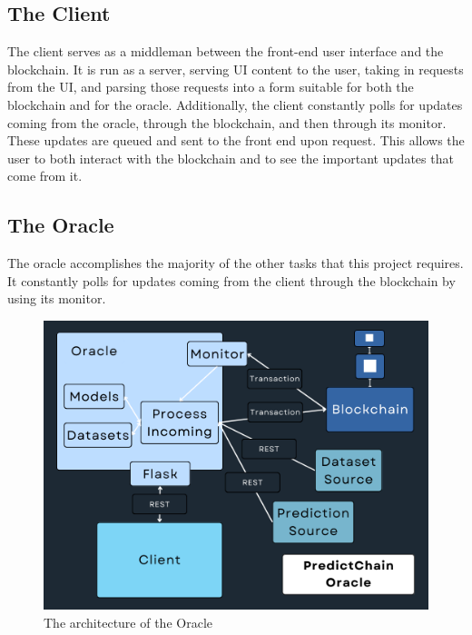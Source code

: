 \documentclass{ledger}
\begin{document}
\subsection{The Client}

The client serves as a middleman between the front-end user interface and the blockchain.  It is run as a server,
serving UI content to the user, taking in requests from the UI, and parsing those requests into a form suitable for
both the blockchain and for the oracle.  Additionally, the client constantly polls for updates coming from the oracle,
through the blockchain, and then through its monitor.  These updates are queued and sent to the front end upon request.
This allows the user to both interact with the blockchain and to see the important updates that come from it.

\subsection{The Oracle}

The oracle accomplishes the majority of the other tasks that this project requires.  It constantly polls for updates
coming from the client through the blockchain by using its monitor.

\begin{figure}[H]
    \begin{center}
        \begin{minipage}{0.6\textwidth}
        \centering
        \includegraphics[width=\linewidth]{images/oracleDiagram}
        \caption{The architecture of the Oracle}\label{Fig:oracleDiagram}
    \end{minipage}\hfill
    \end{center}
\end{figure}
\end{document}
